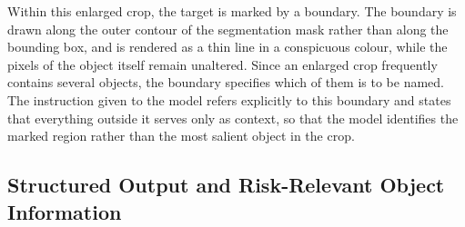 {Within this enlarged crop, the target is marked by a boundary. The boundary is drawn along the outer contour of the segmentation mask rather than along the bounding box, and is rendered as a thin line in a conspicuous colour, while the pixels of the object itself remain unaltered. Since an enlarged crop frequently contains several objects, the boundary specifies which of them is to be named. The instruction given to the model refers explicitly to this boundary and states that everything outside it serves only as context, so that the model identifies the marked region rather than the most salient object in the crop.

}

\subsection{Structured Output and Risk-Relevant Object Information}
\label{subsec:method_vlm_contract}

